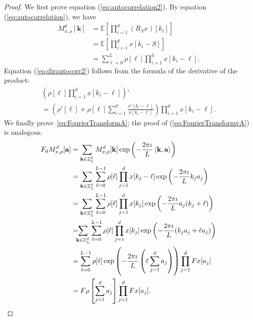 \documentclass{IEEEtran}
\numberwithin{equation}{section}
\numberwithin{figure}{section}
\theoremstyle{plain}
\theoremstyle{definition}
\theoremstyle{remark}
\theoremstyle{plain}
\theoremstyle{remark}
\theoremstyle{plain}
\theoremstyle{plain}
\theoremstyle{remark}
\newcommand{\E}{\mathbb{E}}
\newcommand{\F}{F}
\newcommand{\Z}{{\mathbb{Z}}}
\newcommand{\kk}{{\mathbf{k}}}
\newcommand{\modminus}{-}
\newcommand{\modplus}{+}
\def\aa{\mathbf{a}}
\begin{document}
\begin{proof}
	We first prove equation (\ref{eq:autocorrelation2}). By equation (\ref{eq:autocorrelation}), we have 
	\begin{align*}
	M^d_{x,\rho}[\kk]&=\E\left[\prod_{i=1}^d (R_Sx)[k_i]\right]\\
	&=\E\left[\prod_{i=1}^d x[k_i\modminus S]\right]\\
	&=\sum _{\ell=0}^L \rho[\ell]\prod_{i=1}^d x[k_i\modminus \ell].
	\end{align*}
	Equation (\ref{eq:dirautocorr2}) follows from the formula of the derivative of the product:
	\begin{multline*}
	\left(\rho[\ell]\prod_{i=1}^d x[k_i\modminus \ell]\right)'\\
	=\left(\rho'[\ell]+\rho[\ell]\sum_{i=1}^d \frac {x'[k_i\modminus \ell]}{x[k_i\modminus \ell]}\right)\prod_{i=1}^d x[k_i\modminus \ell].
	\end{multline*}
	We finally prove~\eqref{eq:FourierTransformA}; the proof of (\ref{eq:FourierTransformvA}) is analogous.
	\begin{align*}
	\F_dM^d_{x,\rho}[\aa]&=\sum_{\kk\in\Z_L^d}
	M^d_{x,\rho}[\kk]\exp\left(-\frac{2\pi \iota}L \left<\kk,\aa\right> \right)\\
	&= \sum_{\kk\in\Z_L^d}
	\sum _{\ell=0}^{L-1} \rho[\ell]\prod_{j=1}^d x[k_j\modminus \ell]\exp\left(-\frac{2\pi \iota}L k_ja_j \right)\\
	&=\sum_{\kk\in\Z_L^d}
	\sum _{\ell=0}^{L-1} \rho[\ell]\prod_{j=1}^d x[k_j]\exp\left(-\frac{2\pi \iota}L a_j(k_j\modplus \ell)\right)\\
	&= \hspace{-6pt} \sum_{\kk\in\Z_L^d}
	\sum _{\ell=0}^{L-1} \rho[\ell]\prod_{j=1}^d x[k_j]\exp\left(-\frac{2\pi \iota}L (k_ja_j+\ell a_j )\right)\\
	&=\sum _{\ell=0}^{L-1} \rho[\ell]\exp\left(-\frac{2\pi \iota}L \left(\ell\sum_{j=1}^d a_j\right)\right) \prod_{j=1}^d \F x[a_j]\\
	&=\F \rho\left[\sum_{j=1}^d a_j\right]\prod_{j=1}^d \F x[a_j].
	\end{align*}
\end{proof}
\end{document}
